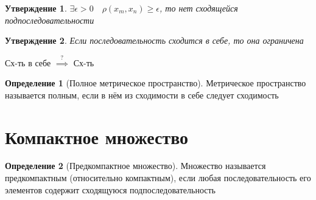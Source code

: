 \documentclass[a4paper]{article}
\newtheorem*{statement}{Утверждение}
\theoremstyle{definition}
\newtheorem*{definition}{Определение}
\theoremstyle{remark}
\begin{document}
\begin{tcolorbox}
\begin{statement}
    $ \exists \epsilon > 0 \quad \rho(x_m, x_n) \geq \epsilon $, то нет сходящейся
    подпоследовательности
\end{statement}
\end{tcolorbox}

\begin{tcolorbox}
\begin{statement}
    Если последовательность сходится в себе, то она ограничена
\end{statement}
\end{tcolorbox}

Сх-ть в себе $ \stackrel{?}{\implies} $ Сх-ть

\begin{tcolorbox}
    \begin{definition}[Полное метрическое пространство]
    Метрическое пространство называется полным, если в нём из сходимости в себе
    следует сходимость
\end{definition}
\end{tcolorbox}

\section*{\centering Компактное множество}

\begin{tcolorbox}
    \begin{definition}[Предкомпактное множество]
        Множество называется предкомпактным (относительно компактным), если
        любая последовательность его элементов содержит сходящуюся подпоследовательность
    \end{definition}
\end{tcolorbox}
\end{document}
